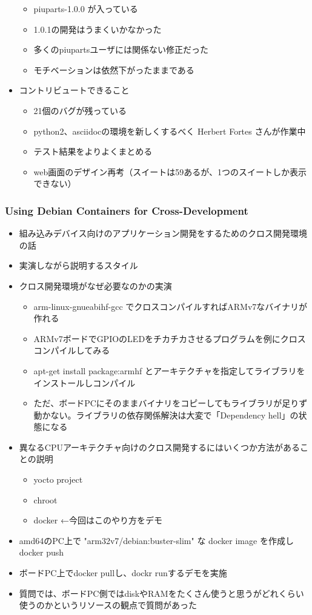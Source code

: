 \documentclass[mingoth,a4paper]{jsarticle}
\begin{document}
\begin{itemize}
\begin{itemize}
  \item piuparts-1.0.0 が入っている
  \item 1.0.1の開発はうまくいかなかった
  \item 多くのpiupartsユーザには関係ない修正だった
  \item モチベーションは依然下がったままである
  \end{itemize}
\item コントリビュートできること
  \begin{itemize}
  \item 21個のバグが残っている
  \item python2、asciidocの環境を新しくするべく Herbert Fortes さんが作業中
  \item テスト結果をよりよくまとめる
  \item web画面のデザイン再考（スイートは59あるが、1つのスイートしか表示できない）
  \end{itemize}
\end{itemize}


\subsubsection{Using Debian Containers for Cross-Development}

\begin{itemize}
\item 組み込みデバイス向けのアプリケーション開発をするためのクロス開発環境の話
\item 実演しながら説明するスタイル
\item クロス開発環境がなぜ必要なのかの実演
  \begin{itemize}
  \item arm-linux-gnueabihf-gcc でクロスコンパイルすればARMv7なバイナリが作れる
  \item ARMv7ボードでGPIOのLEDをチカチカさせるプログラムを例にクロスコンパイルしてみる
  \item apt-get install package:armhf とアーキテクチャを指定してライブラリをインストールしコンパイル
  \item ただ、ボードPCにそのままバイナリをコピーしてもライブラリが足りず動かない。ライブラリの依存関係解決は大変で「Dependency hell」の状態になる
  \end{itemize}
\item 異なるCPUアーキテクチャ向けのクロス開発するにはいくつか方法があることの説明
  \begin{itemize}
  \item yocto project
  \item chroot
  \item docker ←今回はこのやり方をデモ
  \end{itemize}
\item amd64のPC上で "arm32v7/debian:buster-slim" な docker image を作成し docker push
\item ボードPC上でdocker pullし、dockr runするデモを実施
\item 質問では、ボードPC側ではdiskやRAMをたくさん使うと思うがどれくらい使うのかというリソースの観点で質問があった
\end{itemize}
\end{document}
